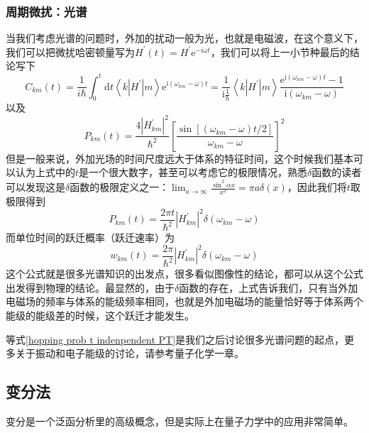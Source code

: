 \documentclass[12pt,a4paper,openany,twoside]{book}
\numberwithin{equation}{section}
\begin{document}
          \subsubsection{周期微扰：光谱}
          当我们考虑光谱的问题时，外加的扰动一般为光，也就是电磁波，在这个意义下，我们可以把微扰哈密顿量写为$H^{\prime}(t)=H^{\prime} \mathrm{e}^{-i \omega t}$，我们可以将上一小节种最后的结论写下
          \begin{equation}
            C_{km}(t)=\frac{1}{i \hbar} \int_{0}^{t} \mathrm{d} t\left\langle k\left|H^{\prime}\right| m\right\rangle \mathrm{e}^{\mathrm{i}\left(\omega_{km}-\omega\right)t} =\frac{1}{\mathrm{i} \frac{1}{\hbar}}\left\langle k\left|H^{\prime}\right| m\right\rangle \frac{\mathrm{e}^{\mathrm{i}\left(\omega_{km}-\omega\right) t}-1}{\mathrm{i}\left(\omega_{km}-\omega\right)}
          \end{equation}
          以及
          \begin{equation}
            P_{k m}(t)=\frac{4\left|H_{k m}^{\prime}\right|^{2}}{\hbar^{2}}\left[\frac{\sin \left[\left(\omega_{k m}-\omega\right) t / 2\right]}{\omega_{k m}-\omega}\right]^{2}
          \end{equation}
          但是一般来说，外加光场的时间尺度远大于体系的特征时间，这个时候我们基本可以认为上式中的$t$是一个很大数字，甚至可以考虑它的极限情况，熟悉$\delta$函数的读者可以发现这是$\delta$函数的极限定义之一：$\lim _{a \rightarrow \infty} \frac{\sin ^{2} \alpha x}{x^{2}}=\pi a \delta(x)$，因此我们将$t$取极限得到
          \begin{equation}
            P_{k m}(t)=\frac{2 \pi t}{\hbar^{2}}\left|H_{ km}^{\prime}\right|^{2} \delta\left(\omega_{km}-\omega\right)
          \end{equation}
          而单位时间的跃迁概率（跃迁速率）为
          \begin{equation}
            w_{k m}(t)=\frac{2 \pi}{\hbar^{2}}\left|H_{ km}^{\prime}\right|^{2} \delta\left(\omega_{km}-\omega\right)
            \label{hopping prob t indenpendent PT}
          \end{equation}
          这个公式就是很多光谱知识的出发点，很多看似图像性的结论，都可以从这个公式出发得到物理的结论。最显然的，由于$\delta$函数的存在，上式告诉我们，只有当外加电磁场的频率与体系的能级频率相同，也就是外加电磁场的能量恰好等于体系两个能级的能级差的时候，这个跃迁才能发生。

          等式\ref{hopping prob t indenpendent PT}是我们之后讨论很多光谱问题的起点，更多关于振动和电子能级的讨论，请参考量子化学一章。
        \subsection{变分法}
          变分是一个泛函分析里的高级概念，但是实际上在量子力学中的应用非常简单。
          
\end{document}
